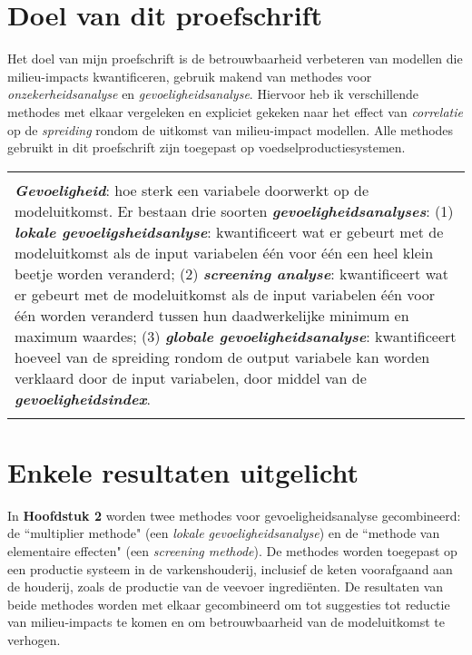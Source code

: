\documentclass[12pt]{amsart}
\begin{document}
{{\normalsize{
\section*{Doel van dit proefschrift}
\noindent
Het doel van mijn proefschrift is de betrouwbaarheid verbeteren van modellen die milieu-impacts kwantificeren, gebruik makend van methodes voor \textit{onzekerheidsanalyse} en \textit{gevoeligheidsanalyse}. Hiervoor heb ik verschillende methodes met elkaar vergeleken en expliciet gekeken naar het effect van \textit{correlatie} op de \textit{spreiding} rondom de uitkomst van milieu-impact modellen. Alle methodes gebruikt in dit proefschrift zijn toegepast op voedselproductiesystemen.}}

\vspace{0.5cm}
\footnotesize{
\begin{tabular}{|p{}|}
\hline
\mbox{}\\
\textit{\textbf{Gevoeligheid}}: hoe sterk een variabele doorwerkt op de modeluitkomst. Er bestaan drie soorten \textit{\textbf{gevoeligheidsanalyses}}: 
(1) \textit{\textbf{lokale gevoeligsheidsanlyse}}: kwantificeert wat er gebeurt met de modeluitkomst als de input variabelen \'{e}\'{e}n voor \'{e}\'{e}n een heel klein beetje worden veranderd;
(2) \textit{\textbf{screening analyse}}: kwantificeert wat er gebeurt met de modeluitkomst als de input variabelen \'{e}\'{e}n voor \'{e}\'{e}n worden veranderd tussen  hun daadwerkelijke minimum en maximum waardes;
(3) \textit{\textbf{globale gevoeligheidsanalyse}}: kwantificeert hoeveel van de spreiding rondom de output variabele kan worden verklaard door de input variabelen, door middel van de \textit{\textbf{gevoeligheidsindex}}. \\ 
\mbox{}\\ \hline
\end{tabular}}
\vspace{0.5cm}

\normalsize{
\section*{Enkele resultaten uitgelicht}
\noindent
In \textbf{Hoofdstuk 2} worden twee methodes voor gevoeligheidsanalyse gecombineerd: de ``multiplier methode" \space (een \textit{lokale gevoeligheidsanalyse}) en de ``methode van elementaire effecten" \space (een \textit{screening methode}). De methodes worden toegepast op een productie systeem in de varkenshouderij, inclusief de keten voorafgaand aan de houderij, zoals de productie van de veevoer ingredi\"{e}nten.  De resultaten van beide methodes worden met elkaar gecombineerd om tot suggesties tot reductie van milieu-impacts te komen en om betrouwbaarheid van de modeluitkomst te verhogen.}

}
\end{document}
